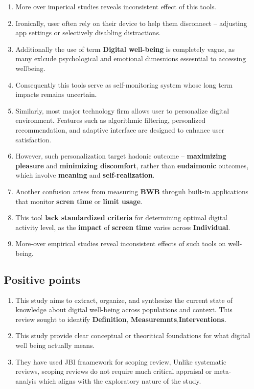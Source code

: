 \documentclass[12pt]{article}
\begin{document}
\begin{enumerate}
    \item More over imperical studies reveals inconsistent effect of this tools.
    \item Ironically, user often rely on their device to help them disconnect -- adjusting app settings or selectively disabling distractions.
    \item Additionally the use of term \textbf{Digital well-being} is completely vague, as many exlcude psychological and emotional dimesnions essesntial to accessing wellbeing.
    \item Consequently this tools serve as self-monitoring system whose long term impacts remains uncertain.
    \item Similarly, most major technology firm allows user to personalize digital environment. Features such as algorithmic filtering, personlized recommendation, and adaptive interface are designed to enhance user satisfaction.
    \item However, such personalization target hadonic outcome -- \textbf{maximizing pleasure} and \textbf{minimizing discomfort},
    rather than \textbf{eudaimonic} outcomes, which involve \textbf{meaning} and \textbf{self-realization}.
    \item Another confusion arises from measuring \textbf{BWB} throguh built-in applications that monitor \textbf{scren time} or \textbf{limit usage}.
    \item This tool \textbf{lack standardized criteria} for determining optimal digital activity level, as the \textbf{impact} of \textbf{screen time} varies across \textbf{Individual}.
    \item More-over empirical studies reveal inconsistent effects of such tools on well-being. 
    

\end{enumerate}
\subsection{Positive points}
\begin{enumerate}
    \item This study aims to extract, organize, and synthesize the current state of knowledge about digital well-being across populations and context. This review sought to identify \textbf{Definition}, \textbf{Measuremnts},\textbf{Interventions}.
    \item This study provide clear conceptual or theoritical foundations for what digital well being actually means.
    \item They have used JBI fraamework for scoping review, Unlike systematic reviews, scoping reviews do not require much critical appraisal or meta-analyis which aligns with the exploratory nature of the study.

\end{enumerate}
\end{document}
